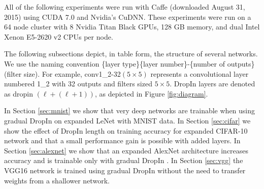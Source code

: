 \documentclass[10pt,twocolumn,letterpaper]{article}
\newcommand{\dropin}{DropIn }
\begin{document}
All of the following experiments were run with Caffe (downloaded August 31, 2015) using CUDA 7.0 and Nvidia's CuDNN.  
These experiments were run on a 64 node cluster with 8 Nvidia Titan Black GPUs, 128 GB memory, and dual Intel Xenon E5-2620 v2 CPUs per node.  

The following subsections depict, in table form, the structure of several networks.  We use the naming convention \{layer type\}\{layer number\}-\{number of outputs\}(filter size).  
For example, conv1\_2-32$(5\times 5)$ represents a convolutional layer numbered 1\_2 with 32 outputs and filters sized $5\times 5$.  
\dropin layers are denoted as dropin $(\ell + (\ell + 1))$, as depicted in Figure \ref{fig:diagram}.

In Section \ref{sec:mnist} we show that very deep networks are trainable when using gradual \dropin on expanded LeNet with MNIST data.  In Section \ref{sec:cifar} we show the effect of \dropin length on training accuracy for expanded CIFAR-10 network and that a small performance gain is possible with added layers.
In Section \ref{sec:alexnet} we show that an expanded AlexNet architecture increases accuracy and is trainable only with gradual \dropin.  
In Section \ref{sec:vgg} the VGG16 network is trained using gradual \dropin without the need to transfer weights from a shallower network.  
\end{document}
